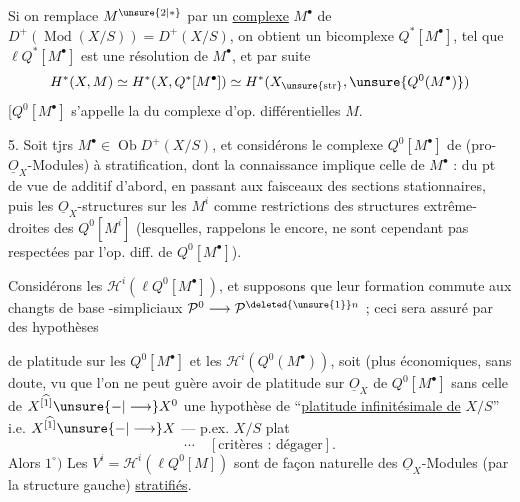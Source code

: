 Si on remplace $M^{\unsure{2|*}}$ par un \uline{complexe} $M^\bullet$ de  $D^+(\operatorname{Mod}(X/S))=D^+(X/S)$, on obtient un bicomplexe $Q^*[M^\bullet]$, tel que $\ell Q^*[M^\bullet]$ est une résolution de $M^\bullet$, et par suite
\[
H^*(X,M)\simeq H^*(X,Q^*[M^\bullet])\simeq H^*(X_{\unsure{\mathrm{str}}},\unsure{Q^0(M^\bullet)})
\]
[$Q^0[M^\bullet]$ s'appelle la \uline{} du complexe  d'op. différentielles $M$.

5. Soit tjrs $M^\bullet\in\operatorname{Ob}D^+(X/S)$, et considérons le complexe $Q^0[M^\bullet]$  \deleted{\unsure{de $Q^0[$}} de (pro-$\underline O_X$-Modules) à stratification, dont la connaissance implique celle de $M^\bullet$ : du pt de vue de  additif d'abord, en passant aux faisceaux des sections stationnaires, puis les $\underline O_X$-structures sur les $M^i$ comme restrictions des structures extrême-droites des $Q^0[M^i]$ (lesquelles, rappelons le encore, ne sont cependant pas respectées par l'op. diff. de $Q^0[M^\bullet]$).

Considérons les $\mathcal H^i(\ell Q^0[M^\bullet])$, et supposons que leur formation commute aux changts de base -simpliciaux $\mathcal P^0\longrightarrow\mathcal P^{\deleted{\unsure{1}}n}$ ; ceci sera assuré par des hypothèses

de  platitude sur les $Q^0[M^\bullet]$ et les $\mathcal H^i(Q^0(M^\bullet))$,  soit (plus économiques, sans doute, vu que l'on ne peut guère avoir de platitude sur $\underline O_X$ de $Q^0[M^\bullet]$ sans celle de $X^{\widehat{[1]}}\unsure{-|\longrightarrow}X^0$\unsure{]|)} une hypothèse de ``\uline{platitude infinitésimale de} $X/S$'' i.e.  $X^{\widehat{[1]}}\unsure{-|\longrightarrow}X$ --- p.ex. $X/S$ plat
\[
\cdots\quad[\text{critères : dégager}].
\]
Alors
 $1^\circ)$ Les $V^i=\mathcal H^i(\ell Q^0[M])$ sont de façon naturelle des $\underline O_X$-Modules (par la structure gauche) \uline{stratifiés}.

